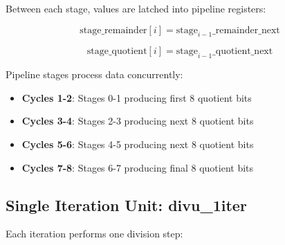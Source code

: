 \documentclass[a4paper, 11pt]{article}
\begin{document}
Between each stage, values are latched into pipeline registers:

\begin{equation}
\text{stage\_remainder}[i] = \text{stage}_{i-1}\text{\_remainder\_next}
\end{equation}

\begin{equation}
\text{stage\_quotient}[i] = \text{stage}_{i-1}\text{\_quotient\_next}
\end{equation}

Pipeline stages process data concurrently:
\begin{itemize}
    \item \textbf{Cycles 1-2}: Stages 0-1 producing first 8 quotient bits
    \item \textbf{Cycles 3-4}: Stages 2-3 producing next 8 quotient bits
    \item \textbf{Cycles 5-6}: Stages 4-5 producing next 8 quotient bits
    \item \textbf{Cycles 7-8}: Stages 6-7 producing final 8 quotient bits
\end{itemize}

\subsection{Single Iteration Unit: divu\_1iter}

Each iteration performs one division step:
\end{document}
